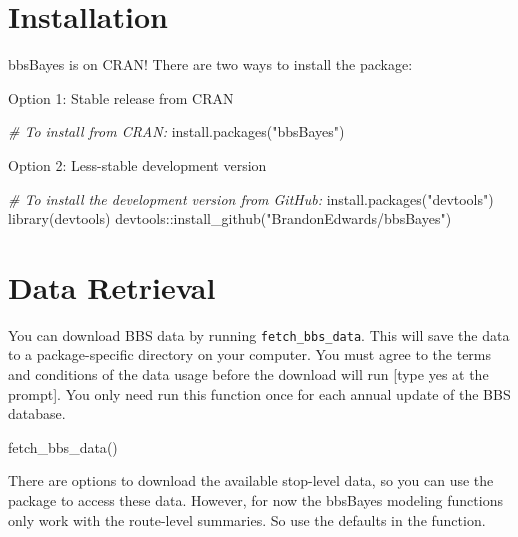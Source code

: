 \documentclass[
]{book}
\newenvironment{Shaded}{\begin{snugshade}}{\end{snugshade}}
\newcommand{\CommentTok}[1]{\textcolor[rgb]{0.56,0.35,0.01}{\textit{#1}}}
\newcommand{\FunctionTok}[1]{\textcolor[rgb]{0.00,0.00,0.00}{#1}}
\newcommand{\NormalTok}[1]{#1}
\newcommand{\SpecialCharTok}[1]{\textcolor[rgb]{0.00,0.00,0.00}{#1}}
\newcommand{\StringTok}[1]{\textcolor[rgb]{0.31,0.60,0.02}{#1}}
\begin{document}
\hypertarget{installation}{%
\section{Installation}\label{installation}}

bbsBayes is on CRAN! There are two ways to install the package:

Option 1: Stable release from CRAN

\begin{Shaded}
\begin{Highlighting}[]
\CommentTok{\# To install from CRAN:}
\FunctionTok{install.packages}\NormalTok{(}\StringTok{"bbsBayes"}\NormalTok{)}
\end{Highlighting}
\end{Shaded}

Option 2: Less-stable development version

\begin{Shaded}
\begin{Highlighting}[]
\CommentTok{\# To install the development version from GitHub:}
\FunctionTok{install.packages}\NormalTok{(}\StringTok{"devtools"}\NormalTok{)}
\FunctionTok{library}\NormalTok{(devtools)}
\NormalTok{devtools}\SpecialCharTok{::}\FunctionTok{install\_github}\NormalTok{(}\StringTok{"BrandonEdwards/bbsBayes"}\NormalTok{)}
\end{Highlighting}
\end{Shaded}

\hypertarget{data-retrieval}{%
\section{Data Retrieval}\label{data-retrieval}}

You can download BBS data by running \texttt{fetch\_bbs\_data}. This will save the data to a package-specific directory on your computer. You must agree to the terms and conditions of the data usage before the download will run {[}type yes at the prompt{]}. You only need run this function once for each annual update of the BBS database.

\begin{Shaded}
\begin{Highlighting}[]
\FunctionTok{fetch\_bbs\_data}\NormalTok{()}
\end{Highlighting}
\end{Shaded}

There are options to download the available stop-level data, so you can use the package to access these data. However, for now the bbsBayes modeling functions only work with the route-level summaries. So use the defaults in the function.
\end{document}
